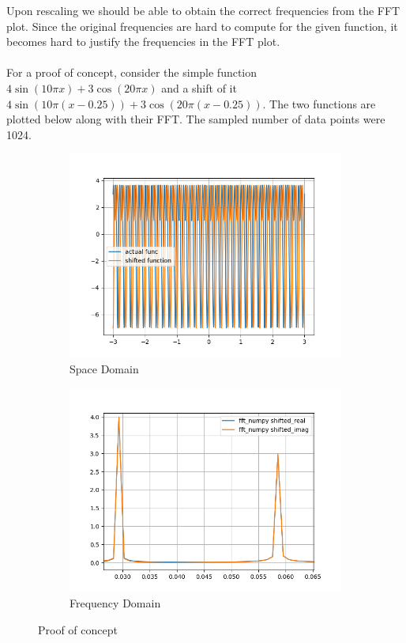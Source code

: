 \documentclass[12pt]{article}
\begin{document}
Upon rescaling we should be able to obtain the correct frequencies from the FFT plot. Since the original frequencies are hard to compute for the given function, it becomes hard to justify the frequencies in the FFT plot. \\\\ For a proof of concept, consider the simple function $4\sin(10\pi x) + 3\cos(20\pi x)$ and a shift of it $4\sin(10\pi (x-0.25)) + 3\cos(20\pi (x-0.25))$. The two functions are plotted below along with their FFT. The sampled number of data points were 1024.
\begin{figure}[h]
	\centering
	\begin{subfigure}[h]{0.40\textwidth}
		\centering
		\includegraphics[width=\textwidth]{POC_space_domain.png}
		\caption{Space Domain }
	\end{subfigure}
	\begin{subfigure}[h]{0.40\textwidth}
		\centering
		\includegraphics[width=\textwidth]{POC_freq.png}
		\caption{Frequency Domain}
	\end{subfigure}
	\caption{Proof of concept}
\end{figure}
\end{document}
